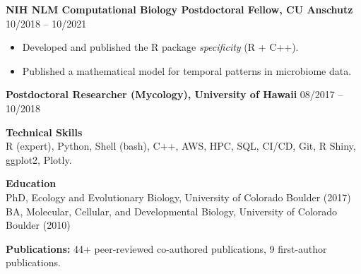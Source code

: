\documentclass[11pt]{article}
\begin{document}
\textbf{NIH NLM Computational Biology Postdoctoral Fellow, CU Anschutz} \hfill 10/2018 -- 10/2021
\begin{itemize}
  \item Developed and published the R package \textit{specificity} (R + C++).
  \item Published a mathematical model for temporal patterns in microbiome data.
\end{itemize}

\textbf{Postdoctoral Researcher (Mycology), University of Hawaii} \hfill 08/2017 -- 10/2018

\textbf{Technical Skills}\\
R (expert), Python, Shell (bash), C++, AWS, HPC, SQL, CI/CD, Git, R Shiny, ggplot2, Plotly.

\textbf{Education}\\
PhD, Ecology and Evolutionary Biology, University of Colorado Boulder (2017)\\
BA, Molecular, Cellular, and Developmental Biology, University of Colorado Boulder (2010)

\vfill
\textbf{Publications:} 44+ peer-reviewed co-authored publications, 9 first-author publications.
\end{document}
